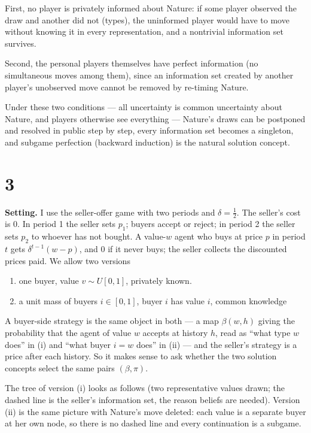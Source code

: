 \documentclass[12pt]{article}
\begin{document}
First, no player is privately informed about Nature: if some player observed the draw and another did not (types), the uninformed player would have to move without knowing it in every representation, and a nontrivial information set survives. 

Second, the personal players themselves have perfect information (no simultaneous moves among them), since an information set created by another player's unobserved move cannot be removed by re-timing Nature. 

Under these two conditions --- all uncertainty is common uncertainty about Nature, and players otherwise see everything --- Nature's draws can be postponed and resolved in public step by step, every information set becomes a singleton, and subgame perfection (backward induction) is the natural solution concept. 

\section*{3}

\textbf{Setting.}
I use the seller-offer game with two periods and $\delta = \tfrac12$. The
seller's cost is $0$. In period 1 the seller sets $p_1$; buyers accept or
reject; in period 2 the seller sets $p_2$ to whoever has not bought. A
value-$w$ agent who buys at price $p$ in period $t$ gets
$\delta^{t-1}(w-p)$, and $0$ if it never buys; the seller collects the
discounted prices paid. We allow two versions 

\begin{enumerate}
    \item one buyer, value $v \sim U[0,1]$,
privately known. 
    \item a unit mass of buyers $i \in [0,1]$, buyer $i$
has value $i$, common knowledge

\end{enumerate}

A buyer-side strategy is the same object in both --- a map $\beta(w,h)$ giving the probability that the agent of value $w$ accepts at history $h$, read as ``what type $w$ does'' in (i) and ``what buyer $i = w$ does'' in (ii) --- and the seller's strategy is a price after each history. So it makes sense to ask whether the two solution concepts select the same pairs $(\beta,\pi)$.
 
The tree of version (i) looks as follows (two representative values drawn;
the dashed line is the seller's information set, the reason beliefs are
needed). Version (ii) is the same picture with Nature's move deleted: each
value is a separate buyer at her own node, so there is no dashed line and
every continuation is a subgame.
 
\end{document}
